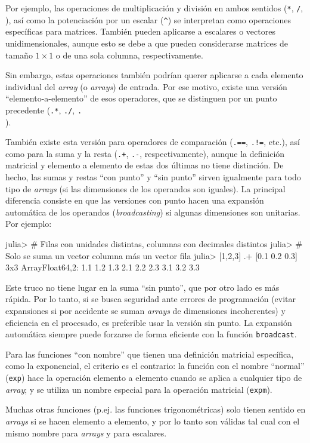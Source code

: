 ﻿\documentclass{article}
\newcommand{\jl}{\texttt}
\begin{document}
Por ejemplo, las operaciones de multiplicación y división en ambos sentidos (\jl{*}, \jl{/}, \jl{\\} ), así como la potenciación por un escalar (\jl{^}) se interpretan como operaciones específicas para matrices. También pueden aplicarse a escalares o vectores unidimensionales, aunque esto se debe a que pueden considerarse matrices de tamaño $1\times{}1$ o de una sola columna, respectivamente.

Sin embargo, estas operaciones también podrían querer aplicarse a cada elemento individual del \emph{array} (o \emph{arrays}) de entrada. Por ese motivo, existe una versión ``elemento-a-elemento'' de esos operadores, que se distinguen por un punto precedente (\jl{.*}, \jl{./}, \jl{.\\}).

También existe esta versión para operadores de comparación (\jl{.==}, \jl{.!=}, etc.), así como para  la suma y la resta (\jl{.+}, \jl{.-}, respectivamente), aunque la definición matricial y elemento a elemento de estas dos últimas no tiene distinción. De hecho, las sumas y restas ``con punto'' y ``sin punto'' sirven igualmente para todo tipo de \emph{arrays} (si las dimensiones de los operandos son iguales). La principal diferencia consiste en que las versiones con punto hacen una expansión automática de los operandos (\emph{broadcasting}) si algunas dimensiones son unitarias. Por ejemplo:

julia> # Filas con unidades distintas, columnas con decimales distintos
julia> # Solo se suma un vector columna más un vector fila
julia> [1,2,3] .+ [0.1 0.2 0.3]
3x3 Array{Float64,2}:
 1.1 1.2 1.3
 2.1 2.2 2.3
 3.1 3.2 3.3

Este truco no tiene lugar en la suma ``sin punto'', que por otro lado es más rápida. Por lo tanto, si se busca seguridad ante errores de programación (evitar expansiones si por accidente se suman \emph{arrays} de dimensiones incoherentes) y eficiencia en el procesado, es preferible usar la versión sin punto. La expansión automática siempre puede forzarse de forma eficiente con la función \jl{broadcast}.

Para las funciones ``con nombre'' que tienen una definición matricial específica, como la exponencial, el criterio es el contrario: la función con el nombre ``normal'' (\jl{exp}) hace la operación elemento a elemento cuando se aplica a cualquier tipo de \emph{array}; y se utiliza un nombre especial para la operación matricial (\jl{expm}).

Muchas otras funciones (p.ej. las funciones trigonométricas) solo tienen sentido en \emph{arrays} si se hacen elemento a elemento, y por lo tanto son válidas tal cual con el mismo nombre para \emph{arrays} y para escalares.
\end{document}
